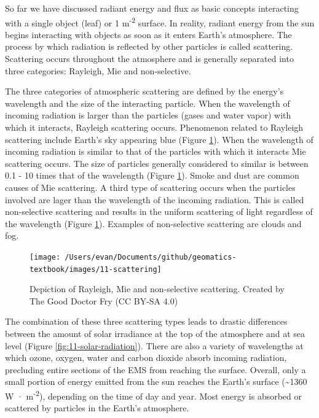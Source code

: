 \documentclass[
]{book}
\begin{document}
So far we have discussed radiant energy and flux as basic concepts
interacting with a single object (leaf) or 1 m\textsuperscript{-2} surface. In reality,
radiant energy from the sun begins interacting with objects as soon
as it enters Earth's atmosphere. The process by which radiation is
reflected by other particles is called scattering. Scattering occurs
throughout the atmosphere and is generally separated into three
categories: Rayleigh, Mie and non-selective.

The three categories of atmospheric scattering are defined by the
energy's wavelength and the size of the interacting particle. When
the wavelength of incoming radiation is larger than the particles
(gases and water vapor) with which it interacts, Rayleigh scattering
occurs. Phenomenon related to Rayleigh scattering include Earth's sky
appearing blue (Figure \ref{fig:11-scattering}). When the wavelength of
incoming radiation is similar to that of the particles with which it
interacts Mie scattering occurs. The size of particles generally
considered to similar is between 0.1 - 10 times that of the wavelength
(Figure \ref{fig:11-scattering}). Smoke and dust are common causes of
Mie scattering. A third type of scattering occurs when the particles
involved are lager than the wavelength of the incoming radiation.
This is called non-selective scattering and results in the uniform
scattering of light regardless of the wavelength (Figure
\ref{fig:11-scattering}). Examples of non-selective scattering are
clouds and fog.

\begin{figure}
\texttt{[image: /Users/evan/Documents/github/geomatics-textbook/images/11-scattering]} \caption{Depiction of Rayleigh, Mie and non-selective scattering. Created by The Good Doctor Fry (CC BY-SA 4.0)}\label{fig:11-scattering}
\end{figure}

The combination of these three scattering types leads to drastic
differences between the amount of solar irradiance at the top of the
atmosphere and at sea level (Figure \ref{fig:11-solar-radiation}).
There are also a variety of wavelengths at which ozone, oxygen, water
and carbon dioxide absorb incoming radiation, precluding entire
sections of the EMS from reaching the surface. Overall, only a small
portion of energy emitted from the sun reaches the Earth's surface
(\textasciitilde1360 W · m\textsuperscript{-2}), depending on the time of day and year. Most
energy is absorbed or scattered by particles in the Earth's
atmosphere.
\end{document}
